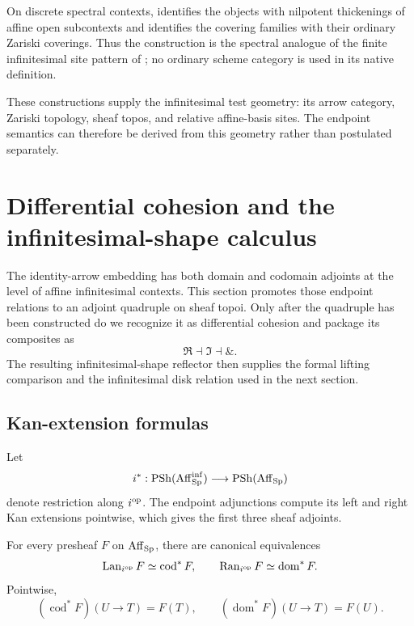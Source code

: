 \begin{remark}
\label{rem:relative-infinitesimal-site-classical}
On discrete spectral contexts, 
identifies the objects with nilpotent thickenings of affine open subcontexts
and identifies the covering families with their ordinary Zariski coverings.
Thus the construction is the spectral analogue of the finite infinitesimal
site pattern of \cite{Ogus1975InfinitesimalSite}; no ordinary scheme category
is used in its native definition.
\end{remark}
These constructions supply the infinitesimal test geometry: its arrow
category, Zariski topology, sheaf topos, and relative affine-basis sites. The
endpoint semantics can therefore be derived from this geometry rather than
postulated separately.

\section{Differential cohesion and the infinitesimal-shape calculus}
\label{sec:endpoint-semantics}

The identity-arrow embedding has both domain and codomain adjoints at the level
of affine infinitesimal contexts. This section promotes those endpoint
relations to an adjoint quadruple on sheaf topoi. Only after the quadruple has
been constructed do we recognize it as differential cohesion and package its
composites as
\[
    \Re\dashv\Im\dashv\&.
\]
The resulting infinitesimal-shape reflector then supplies the formal lifting
comparison and the infinitesimal disk relation used in the next section.

\subsection{Kan-extension formulas}

Let
\[
    i^*:
    \operatorname{PSh}(\operatorname{Aff}_{\operatorname{Sp}}^{\inf})
    \longrightarrow
    \operatorname{PSh}(\operatorname{Aff}_{\operatorname{Sp}})
\]
denote restriction along \(i^{\mathrm{op}}\). The endpoint adjunctions compute its
left and right Kan extensions pointwise, which gives the first three sheaf
adjoints.

\begin{proposition}
\label{prop:endpoint-kan-extensions}
For every presheaf \(F\) on \(\operatorname{Aff}_{\operatorname{Sp}}\), there are canonical equivalences
\[
    \operatorname{Lan}_{i^{\mathrm{op}}}F
    \simeq
    \operatorname{cod}^*F,
    \qquad
    \operatorname{Ran}_{i^{\mathrm{op}}}F
    \simeq
    \operatorname{dom}^*F.
\]
Pointwise,
\[
    (\operatorname{cod}^*F)(U\to T)=F(T),
    \qquad
    (\operatorname{dom}^*F)(U\to T)=F(U).
\]
\end{proposition}


